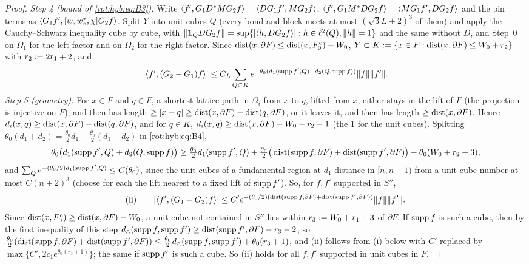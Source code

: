 \begin{proof}
\emph{Step 4 (bound of \eqref{rot:hyb:eq:B3}).} Write $\langle f',G_1D^*MG_2f\rangle=\langle DG_1f',MG_2f\rangle$, $\langle f',G_1M^*DG_2f\rangle=\langle MG_1f',DG_2f\rangle$ and the pin terms as $\langle G_1f',[w_zw_z^*,\chi]G_2f\rangle$. Split $Y$ into unit cubes $Q$ (every bond and block meets at most $(\sqrt3L+2)^3$ of them) and apply the Cauchy--Schwarz inequality cube by cube, with $\|\mathbf 1_QDG_2f\|=\sup\{|\langle h,DG_2f\rangle|:h\in\ell^2(Q),\|h\|=1\}$ and the same without $D$, and Step~0 on $\Omega_1$ for the left factor and on $\Omega_2$ for the right factor. Since $\operatorname{dist}(x,\partial F)\le\operatorname{dist}(x,F_0^c)+W_0$, $Y\subset K:=\{x\in F:\operatorname{dist}(x,\partial F)\le W_0+r_2\}$ with $r_2:=2r_1+2$, and
\begin{equation}\label{rot:hyb:eq:B4}
|\langle f',(G_2-G_1)f\rangle|\le C_L\sum_{Q\subset K}e^{-\theta_0(d_1(\operatorname{supp} f',Q)+d_2(Q,\operatorname{supp} f))}\|f\|\|f'\|.
\end{equation}
\emph{Step 5 (geometry).} For $x\in F$ and $q\in F$, a shortest lattice path in $\Omega_i$ from $x$ to $q$, lifted from $x$, either stays in the lift of $F$ (the projection is injective on $F$), and then has length $\ge|x-q|\ge\operatorname{dist}(x,\partial F)-\operatorname{dist}(q,\partial F)$, or it leaves it, and then has length $\ge\operatorname{dist}(x,\partial F)$. Hence $d_i(x,q)\ge\operatorname{dist}(x,\partial F)-\operatorname{dist}(q,\partial F)$, and for $q\in K$, $d_i(x,q)\ge\operatorname{dist}(x,\partial F)-W_0-r_2-1$ (the $1$ for the unit cubes). Splitting $\theta_0(d_1+d_2)=\frac{\theta_0}2d_1+\frac{\theta_0}2(d_1+d_2)$ in \eqref{rot:hyb:eq:B4},
\[
\theta_0\big(d_1(\operatorname{supp} f',Q)+d_2(Q,\operatorname{supp} f)\big)\ge\tfrac{\theta_0}2d_1(\operatorname{supp} f',Q)+\tfrac{\theta_0}2\big(\operatorname{dist}(\operatorname{supp} f,\partial F)+\operatorname{dist}(\operatorname{supp} f',\partial F)\big)-\theta_0(W_0+r_2+3),
\]
and $\sum_Qe^{-(\theta_0/2)d_1(\operatorname{supp} f',Q)}\le C(\theta_0)$, since the unit cubes of a fundamental region at $d_1$-distance in $[n,n+1)$ from a unit cube number at most $C(n+2)^3$ (choose for each the lift nearest to a fixed lift of $\operatorname{supp} f'$). So, for $f,f'$ supported in $S''$,
\[
\text{(ii)}\qquad|\langle f',(G_1-G_2)f\rangle|\le C'e^{-(\theta_0/2)(\operatorname{dist}(\operatorname{supp} f,\partial F)+\operatorname{dist}(\operatorname{supp} f',\partial F))}\|f\|\|f'\|.
\]
Since $\operatorname{dist}(x,F_0^c)\ge\operatorname{dist}(x,\partial F)-W_0$, a unit cube not contained in $S''$ lies within $r_3:= W_0+r_1+3$ of $\partial F$. If $\operatorname{supp} f$ is such a cube, then by the first inequality of this step $d_\wedge(\operatorname{supp} f,\operatorname{supp} f')\ge\operatorname{dist}(\operatorname{supp} f',\partial F)-r_3-2$, so $\frac{\theta_0}2(\operatorname{dist}(\operatorname{supp} f,\partial F)+\operatorname{dist}(\operatorname{supp} f',\partial F))\le\frac{\theta_0}2d_\wedge(\operatorname{supp} f,\operatorname{supp} f')+\theta_0(r_3+1)$, and (ii) follows from (i) below with $C'$ replaced by $\max\{C',2c_1e^{\theta_0(r_3+1)}\}$; the same if $\operatorname{supp} f'$ is such a cube. So (ii) holds for all $f,f'$ supported in unit cubes in $F$.


\end{proof}
